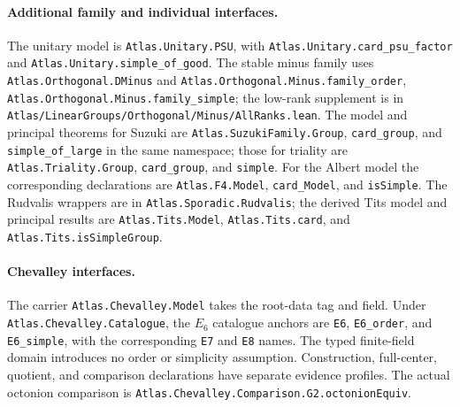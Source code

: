 \documentclass[11pt]{article}
\numberwithin{equation}{section}
\theoremstyle{definition}
\newcommand{\code}[1]{\texttt{\small #1}}
\newcommand{\leanname}[1]{{\small\nolinkurl{#1}}}
\begin{document}
\paragraph{Additional family and individual interfaces.}
The unitary model is \leanname{Atlas.Unitary.PSU}, with
\leanname{Atlas.Unitary.card_psu_factor} and
\leanname{Atlas.Unitary.simple_of_good}. The stable minus family uses
\leanname{Atlas.Orthogonal.DMinus} and
\leanname{Atlas.Orthogonal.Minus.family_order},
\leanname{Atlas.Orthogonal.Minus.family_simple}; the low-rank supplement
is in \leanname{Atlas/LinearGroups/Orthogonal/Minus/AllRanks.lean}.
The model and principal theorems for Suzuki are
\leanname{Atlas.SuzukiFamily.Group}, \code{card\_group}, and
\code{simple\_of\_large} in the same namespace; those for triality are
\leanname{Atlas.Triality.Group}, \code{card\_group}, and \code{simple}.
For the Albert model the corresponding declarations are
\leanname{Atlas.F4.Model}, \code{card\_Model}, and \code{isSimple}.
The Rudvalis wrappers are in \leanname{Atlas.Sporadic.Rudvalis}; the
derived Tits model and principal results are \leanname{Atlas.Tits.Model},
\leanname{Atlas.Tits.card}, and \leanname{Atlas.Tits.isSimpleGroup}.

\paragraph{Chevalley interfaces.}
The carrier \leanname{Atlas.Chevalley.Model} takes the root-data tag and
field. Under \leanname{Atlas.Chevalley.Catalogue}, the $E_6$ catalogue
anchors are \code{E6}, \code{E6\_order}, and \code{E6\_simple}, with the
corresponding \code{E7} and \code{E8} names. The typed finite-field domain
introduces no order or simplicity assumption. Construction, full-center,
quotient, and comparison declarations have separate evidence profiles.
The actual octonion comparison is
\mbox{\leanname{Atlas.Chevalley.Comparison.G2.octonionEquiv}}.
\end{document}
